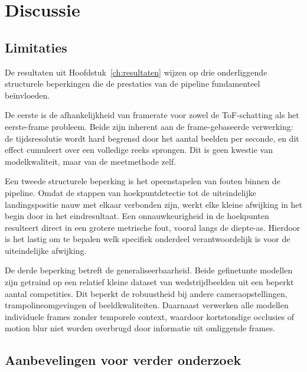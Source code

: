 
\chapter{Discussie}
\label{ch:discussie}

\section{Limitaties}
\label{sec:limitaties}

De resultaten uit Hoofdstuk~\ref{ch:resultaten} wijzen op drie onderliggende structurele beperkingen die de prestaties van de pipeline fundamenteel beïnvloeden.

De eerste is de afhankelijkheid van framerate voor zowel de ToF-schatting als het eerste-frame probleem. Beide zijn inherent aan de frame-gebaseerde verwerking: de tijdsresolutie wordt hard begrensd door het aantal beelden per seconde, en dit effect cumuleert over een volledige reeks sprongen. Dit is geen kwestie van modelkwaliteit, maar van de meetmethode zelf.

Een tweede structurele beperking is het opeenstapelen van fouten binnen de pipeline. Omdat de stappen van hoekpuntdetectie tot de uiteindelijke landingspositie nauw met elkaar verbonden zijn, werkt elke kleine afwijking in het begin door in het eindresultaat. Een onnauwkeurigheid in de hoekpunten resulteert direct in een grotere metrische fout, vooral langs de diepte-as. Hierdoor is het lastig om te bepalen welk specifiek onderdeel verantwoordelijk is voor de uiteindelijke afwijking.

De derde beperking betreft de generaliseerbaarheid. Beide gefinetunte modellen zijn getraind op een relatief kleine dataset van wedstrijdbeelden uit een beperkt aantal competities. Dit beperkt de robuustheid bij andere cameraopstellingen, trampolineomgevingen of beeldkwaliteiten. Daarnaast verwerken alle modellen individuele frames zonder temporele context, waardoor kortstondige occlusies of motion blur niet worden overbrugd door informatie uit omliggende frames.

\section{Aanbevelingen voor verder onderzoek}
\label{sec:aanbevelingen}

